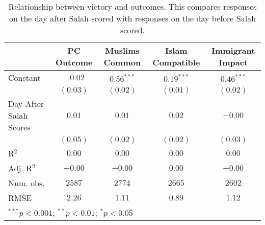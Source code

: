 
\begin{table}[H]
\begin{center}
\begin{footnotesize}
\begin{tabular}{l c c c c}
\hline
 & PC Outcome & Muslims Common & Islam Compatible & Immigrant Impact \\
\hline
Constant               & $-0.02$  & $0.56^{***}$ & $0.19^{***}$ & $0.46^{***}$ \\
                       & $(0.03)$ & $(0.02)$     & $(0.01)$     & $(0.02)$     \\
Day After
Salah Scores & $0.01$   & $0.01$       & $0.02$       & $-0.00$      \\
                       & $(0.05)$ & $(0.02)$     & $(0.02)$     & $(0.03)$     \\
\hline
R$^2$                  & $0.00$   & $0.00$       & $0.00$       & $0.00$       \\
Adj. R$^2$             & $-0.00$  & $-0.00$      & $0.00$       & $-0.00$      \\
Num. obs.              & $2587$   & $2774$       & $2665$       & $2602$       \\
RMSE                   & $2.26$   & $1.11$       & $0.89$       & $1.12$       \\
\hline
\multicolumn{5}{l}{\tiny{$^{***}p<0.001$; $^{**}p<0.01$; $^{*}p<0.05$}}
\end{tabular}
\end{footnotesize}
\caption{Relationship between victory and outcomes. This compares responses on the day after Salah scored 
       with responses on the day before Salah scored.}
\label{tab:fb_scored1}
\end{center}
\end{table}
